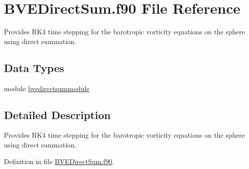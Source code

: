 \hypertarget{BVEDirectSum_8f90}{\section{B\+V\+E\+Direct\+Sum.\+f90 File Reference}
\label{BVEDirectSum_8f90}
}


Provides R\+K4 time stepping for the barotropic vorticity equations on the sphere using direct summation.  


\subsection*{Data Types}
\begin{DoxyCompactItemize}
\item 
module \hyperlink{classbvedirectsummodule}{bvedirectsummodule}
\end{DoxyCompactItemize}


\subsection{Detailed Description}
Provides R\+K4 time stepping for the barotropic vorticity equations on the sphere using direct summation. 



Definition in file \hyperlink{BVEDirectSum_8f90_source}{B\+V\+E\+Direct\+Sum.\+f90}.

